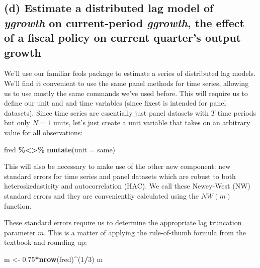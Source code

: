 \documentclass[
]{article}
\newenvironment{Shaded}{\begin{snugshade}}{\end{snugshade}}
\newcommand{\AttributeTok}[1]{\textcolor[rgb]{0.13,0.29,0.53}{#1}}
\newcommand{\DecValTok}[1]{\textcolor[rgb]{0.00,0.00,0.81}{#1}}
\newcommand{\FloatTok}[1]{\textcolor[rgb]{0.00,0.00,0.81}{#1}}
\newcommand{\FunctionTok}[1]{\textcolor[rgb]{0.13,0.29,0.53}{\textbf{#1}}}
\newcommand{\NormalTok}[1]{#1}
\newcommand{\OtherTok}[1]{\textcolor[rgb]{0.56,0.35,0.01}{#1}}
\newcommand{\SpecialCharTok}[1]{\textcolor[rgb]{0.81,0.36,0.00}{\textbf{#1}}}
\newcommand{\StringTok}[1]{\textcolor[rgb]{0.31,0.60,0.02}{#1}}
\begin{document}
\hypertarget{d-estimate-a-distributed-lag-model-of-ygrowth-on-current-period-ggrowth-the-effect-of-a-fiscal-policy-on-current-quarters-output-growth}{%
\subsection{\texorpdfstring{(d) Estimate a distributed lag model of
\emph{ygrowth} on current-period \emph{ggrowth}, the effect of a fiscal
policy on current quarter's output
growth}{(d) Estimate a distributed lag model of ygrowth on current-period ggrowth, the effect of a fiscal policy on current quarter's output growth}}\label{d-estimate-a-distributed-lag-model-of-ygrowth-on-current-period-ggrowth-the-effect-of-a-fiscal-policy-on-current-quarters-output-growth}}

We'll use our familiar feols package to estimate a series of distributed
lag models. We'll find it convenient to use the same panel methods for
time series, allowing us to use mostly the same commands we've used
before. This will require us to define our unit and and time variables
(since fixest is intended for panel datasets). Since time series are
essentially just panel datasets with \(T\) time periods but only \(N=1\)
units, let's just create a unit variable that takes on an arbitrary
value for all observations:

\begin{Shaded}
\begin{Highlighting}[]
\NormalTok{fred }\SpecialCharTok{\%\textless{}\textgreater{}\%} \FunctionTok{mutate}\NormalTok{(}\AttributeTok{unit =} \StringTok{\textquotesingle{}same\textquotesingle{}}\NormalTok{)}
\end{Highlighting}
\end{Shaded}

This will also be necessary to make use of the other new component: new
standard errors for time series and panel datasets which are robust to
both heteroskedasticity and autocorrelation (HAC). We call these
Newey-West (NW) standard errors and they are convenientliy calculated
using the \(NW(m)\) function.

These standard errors require us to determine the appropriate lag
truncation parameter \(m\). This is a matter of applying the
rule-of-thumb formula from the textbook and rounding up:

\begin{Shaded}
\begin{Highlighting}[]
\NormalTok{m }\OtherTok{\textless{}{-}} \FloatTok{0.75}\SpecialCharTok{*}\FunctionTok{nrow}\NormalTok{(fred)}\SpecialCharTok{\^{}}\NormalTok{(}\DecValTok{1}\SpecialCharTok{/}\DecValTok{3}\NormalTok{)}
\NormalTok{m}
\end{Highlighting}
\end{Shaded}
\end{document}
